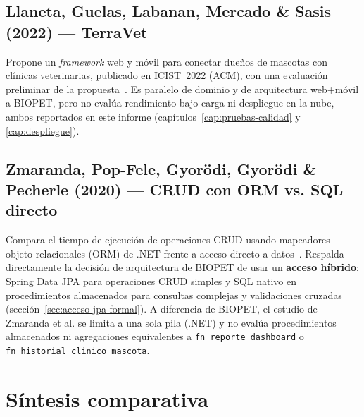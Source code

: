 \subsection{Llaneta, Guelas, Labanan, Mercado \& Sasis (2022) --- TerraVet}
Propone un \emph{framework} web y m\'ovil para conectar due\~nos de
mascotas con cl\'inicas veterinarias, publicado en ICIST~2022 (ACM), con
una evaluaci\'on preliminar de la propuesta~\cite{llaneta2022terravet}. Es
paralelo de dominio y de arquitectura web+m\'ovil a BIOPET, pero no eval\'ua
rendimiento bajo carga ni despliegue en la nube, ambos reportados en este
informe (cap\'itulos~\ref{cap:pruebas-calidad} y \ref{cap:despliegue}).

\subsection{Zmaranda, Pop-Fele, Gyor\"odi, Gyor\"odi \& Pecherle (2020) --- CRUD con ORM vs. SQL directo}
Compara el tiempo de ejecuci\'on de operaciones CRUD usando mapeadores
objeto-relacionales (ORM) de .NET frente a acceso directo a
datos~\cite{zmaranda2020crud}. Respalda directamente la decisi\'on de
arquitectura de BIOPET de usar un \textbf{acceso h\'ibrido}: Spring Data
JPA para operaciones CRUD simples y SQL nativo en procedimientos
almacenados para consultas complejas y validaciones cruzadas
(secci\'on~\ref{sec:acceso-jpa-formal}). A diferencia de BIOPET, el estudio
de Zmaranda et al. se limita a una sola pila (.NET) y no eval\'ua
procedimientos almacenados ni agregaciones equivalentes a
\texttt{fn\_reporte\_dashboard} o \texttt{fn\_historial\_clinico\_mascota}.

\section{S\'intesis comparativa}
\label{sec:sintesis-trabajos-relacionados}

